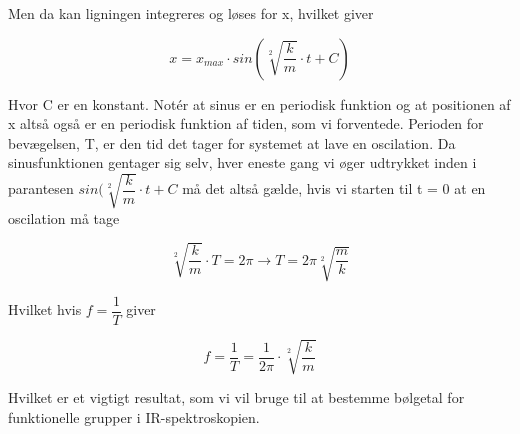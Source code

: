 Men da kan ligningen integreres og løses for x, hvilket giver

\begin{center}
\begin{equation}
x = x_{max} \cdot sin(\sqrt[2]{\dfrac{k}{m}} \cdot t + C)
\end{equation}
\end{center}
\bigskip
Hvor C er en konstant. Notér at sinus er en periodisk funktion og at positionen af x altså også er en periodisk funktion af tiden, som vi forventede. Perioden for bevægelsen, T, er den tid det tager for systemet at lave en oscilation. Da sinusfunktionen gentager sig selv, hver eneste gang vi øger udtrykket inden i parantesen $sin(\sqrt[2]{\dfrac{k}{m}} \cdot t + C$ må det altså gælde, hvis vi starten til t = 0 at en oscilation må tage

\begin{center}
\begin{equation}
\sqrt[2]{\dfrac{k}{m}} \cdot T = 2 \pi \rightarrow T = 2 \pi \sqrt[2]{\dfrac{m}{k}}
\end{equation}
\end{center}

Hvilket hvis $f = \dfrac{1}{T}$ giver

\begin{center}
\begin{equation}
f = \dfrac{1}{T} = \dfrac{1}{2 \pi} \cdot \sqrt[2]{\dfrac{k}{m}}
\end{equation}
\end{center}

Hvilket er et vigtigt resultat, som vi vil bruge til at bestemme bølgetal for funktionelle grupper i IR-spektroskopien. 